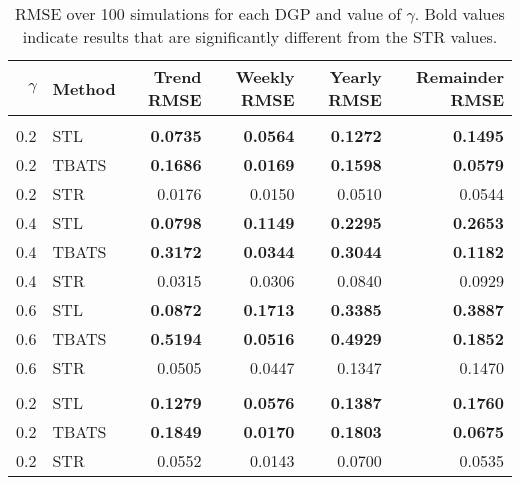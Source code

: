 \documentclass[11pt,a4paper,]{article}
\begin{document}
\begin{table}[!ht]

\caption{\label{tab:cbetable}RMSE over 100 simulations for each DGP and value of $\gamma$. Bold values indicate results that are significantly different from the STR values.}
\centering
\begin{tabular}[t]{rlrrrr}
\toprule
$\gamma$ & Method & Trend RMSE & Weekly RMSE & Yearly RMSE & Remainder RMSE\\
\midrule
\addlinespace[0.3em]
\multicolumn{6}{l}{\textbf{Stochastic DGP}}\\
\hspace{1em}0.2 & STL & \textbf{0.0735} & \textbf{0.0564} & \textbf{0.1272} & \textbf{0.1495}\\
\hspace{1em}0.2 & TBATS & \textbf{0.1686} & \textbf{0.0169} & \textbf{0.1598} & \textbf{0.0579}\\
\hspace{1em}0.2 & STR & 0.0176 & 0.0150 & 0.0510 & 0.0544\\
\midrule
\hspace{1em}0.4 & STL & \textbf{0.0798} & \textbf{0.1149} & \textbf{0.2295} & \textbf{0.2653}\\
\hspace{1em}0.4 & TBATS & \textbf{0.3172} & \textbf{0.0344} & \textbf{0.3044} & \textbf{0.1182}\\
\hspace{1em}0.4 & STR & 0.0315 & 0.0306 & 0.0840 & 0.0929\\
\midrule
\hspace{1em}0.6 & STL & \textbf{0.0872} & \textbf{0.1713} & \textbf{0.3385} & \textbf{0.3887}\\
\hspace{1em}0.6 & TBATS & \textbf{0.5194} & \textbf{0.0516} & \textbf{0.4929} & \textbf{0.1852}\\
\hspace{1em}0.6 & STR & 0.0505 & 0.0447 & 0.1347 & 0.1470\\
\midrule
\addlinespace[0.3em]
\multicolumn{6}{l}{\textbf{Deterministic GDP}}\\
\hspace{1em}0.2 & STL & \textbf{0.1279} & \textbf{0.0576} & \textbf{0.1387} & \textbf{0.1760}\\
\hspace{1em}0.2 & TBATS & \textbf{0.1849} & \textbf{0.0170} & \textbf{0.1803} & \textbf{0.0675}\\
\hspace{1em}0.2 & STR & 0.0552 & 0.0143 & 0.0700 & 0.0535\\

\end{tabular}
\end{table}
\end{document}
